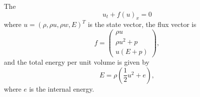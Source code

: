 \documentclass[]{article}
\begin{document}
        The 
        \begin{equation}
           u_{t} + f(u)_{x} = 0
            \label{euler1d}
        \end{equation}
        where $u = \left( \rho, \rho u, \rho w, E \right)^{T}$ is
        the state vector, the flux vector is
        \begin{equation}
            f = 
        \begin{pmatrix}
        \rho u \\ \rho u^2 + p \\ u( E + p )
        \end{pmatrix},
        \end{equation}
        and the total energy per unit volume is given by
        \begin{equation*}
            E = \rho \left( \frac{1}{2} u^2 + e \right),
        \end{equation*}
        where $e$ is the internal energy.
\end{document}

